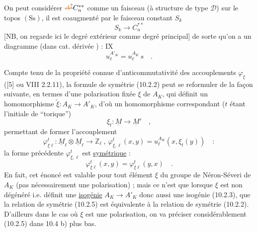 On peut considérer $\deleted{\unsure{A}}C_n^{**}$ comme un faisceau (à structure de type $\mathscr D$) sur  le topos $(\mathrm{Ss})$, il est coaugmenté par le faisceau constant $S_k$
\[
 S_k\longrightarrow C_{n}^{**}
\]
 [NB, on regarde ici le degré extérieur comme degré principal] de sorte qu'on a un diagramme (dans  cat. dérivée   ) :
\hfill IX
\[
 u_\ell^{A'_K}=u_\ell^{A_K}\,s\quad.\tag*{(10.2.2)}
\]

Compte tenu de la propriété connue d'anticommutativité des accouplements $\varphi_\xi$ ([5] ou VIII 2.2.11), la formule de symétrie (10.2.2) peut se reformuler de la façon suivante, en termes d'une polarisation fixée $\xi$ de $A_K$, qui définit un homomorphisme $\widetilde\xi:A_K\longrightarrow A'_K$, d'où un homomorphisme correspondant ($t$ étant l'initiale de ``torique'')
\[
 \xi_t:\underline M\longrightarrow\underline M'\quad,\tag*{(10.2.3)}
\]
permettant de former l'accouplement
\[
 \varphi^t_{\xi\ell}:\underline M_\ell\otimes\underline M_\ell\longrightarrow\mathbb Z_\ell
 \ ,\ \varphi^t_{\xi,\ell}(x,y)=u_\ell^{A_K}(x,\xi_t(y))\quad:\tag*{(10.2.4)}
\]
la forme précédente $\varphi^t_{\xi,\ell}$ est \uline{symétrique} :
\[
 \varphi^t_{\xi\ell}(x,y)=\varphi^t_{\xi\ell}(y,x)\quad.\tag*{(10.2.5)}
\]
En fait, cet énoncé est valable pour tout élément $\xi$ du groupe de Néron-Séveri de $A_K$ (pas nécessairement une polarisation) ; mais ce n'est que lorsque $\xi$ est non dégénéré i.e. définit une \uline{isogénie} $A_K\to A'_K$ donc aussi une isogénie (10.2.3), que la relation de symétrie (10.2.5) est équivalente à la relation de symétrie (10.2.2). D'ailleurs dans le cas où $\xi$ est une polarisation, on va préciser considérablement (10.2.5) dans 10.4 b) plus bas.

